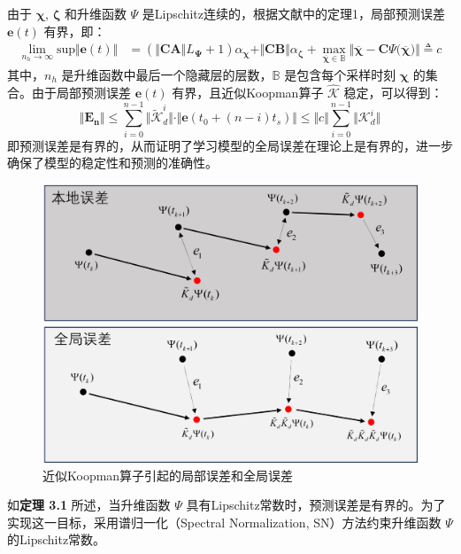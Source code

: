 \documentclass[lang=chs, degree=master, blindreview=false, winfonts=true]{yanputhesis}
\begin{document}
由于 $\bm{\chi}$, $\bm{\zeta}$ 和升维函数 ${\Psi}$ 是Lipschitz连续的，根据文献中的定理1，局部预测误差 $\bm{e}(t)$ 有界，即：
\begin{equation}
	\begin{aligned}
	\lim_{n_h\rightarrow \infty} \text{sup} \Vert \bm{e}(t) \Vert &=(\Vert \bm{CA} \Vert L_{\bm{\Psi}}+1) \alpha_{\bm{\chi}}+\Vert \bm{CB}\Vert \alpha_{\bm{\zeta}} +\max_{\overline{\bm{\chi}}\in \mathbb{B}} \Vert \overline{\bm{\chi}} -\bm{C} \Psi\bm{(\overline{\bm{\chi}}}) \Vert \triangleq c
\end{aligned}
\end{equation}
其中，$n_h$ 是升维函数中最后一个隐藏层的层数，$\mathbb{B}$ 是包含每个采样时刻 $\bm{\chi}$ 的集合。由于局部预测误差 $\bm{e}(t)$ 有界，且近似Koopman算子 $\hat{\bm{\mathcal{K}}}$ 稳定，可以得到：
\begin{equation}
	\Vert \bm{E_n} \Vert \le \sum_{i=0}^{n-1}\Vert \tilde{\mathcal{K}}_d^i\Vert \cdot \Vert \bm{e}(t_0+(n-i)t_s) \Vert\le \Vert c \Vert \sum_{i=0}^{n-1}\Vert {\mathcal{K}}_d^i \Vert
\end{equation}
即预测误差是有界的，从而证明了学习模型的全局误差在理论上是有界的，进一步确保了模型的稳定性和预测的准确性。

\begin{figure}[hbt!]
	\centering
	\includegraphics[width=28pc]{picture/3_2.png} 
	\caption{近似Koopman算子引起的局部误差和全局误差} \label{3_2}
\end{figure}
如\textbf{定理 3.1} 所述，当升维函数 $\Psi$ 具有Lipschitz常数时，预测误差是有界的。为了实现这一目标，采用谱归一化（Spectral Normalization, SN）方法约束升维函数 ${\Psi}$ 的Lipschitz常数。
\end{document}
